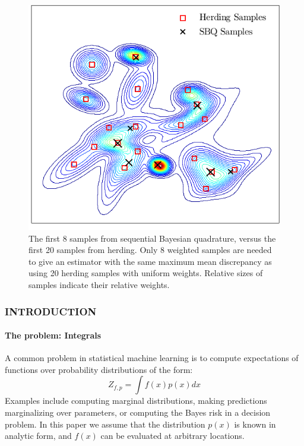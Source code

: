 \begin{figure}[h]
\centering
\includegraphics[width=\columnwidth]{figs/herding/fig1_v2}
\caption{The first 8 samples from sequential Bayesian quadrature, versus the first 20 samples from herding.  Only 8 weighted \sbq{} samples are needed to give an estimator with the same maximum mean discrepancy as using 20 herding samples with uniform weights.  Relative sizes of samples indicate their relative weights.}
\label{fig:fig1}
\end{figure} 

\subsubsection{INTRODUCTION}
\paragraph{The problem: Integrals} A common problem in statistical machine learning is to compute expectations of functions over probability distributions of the form:
\begin{equation}
	Z_{f,p} = \int f(x) p(x) dx \label{eqn:integral}
\end{equation}
Examples include computing marginal distributions, making predictions marginalizing over parameters, or computing the Bayes risk in a decision problem. In this paper we assume that the distribution $p(x)$ is known in analytic form, and $f(x)$ can be evaluated at arbitrary locations.

